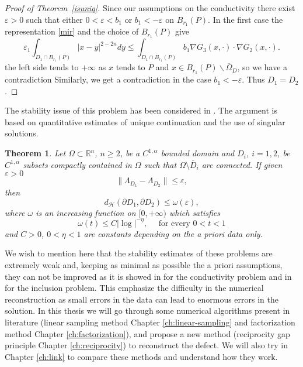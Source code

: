 \documentclass[10pt, a4paper, twoside, openright]{book}
\theoremstyle{definition}
\theoremstyle{plain}
\newtheorem{theorem}[subsection]{Theorem}
\theoremstyle{plain}
\theoremstyle{plain}
\theoremstyle{plain}
\theoremstyle{plain}
\theoremstyle{plain}
\theoremstyle{plain}
\theoremstyle{plain}
\begin{document}
\begin{proof}[Proof of Theorem~\ref{isuniq}]
Since our assumptions on the conductivity there exist $\varepsilon>0$ such that
either $0<\varepsilon<b_1$ or $b_1<-\varepsilon$ on $B_{r_1}(P)$.
In the first case the representation \eqref{mir} and the choice of
$B_{r_1}(P)$ give
$$\varepsilon_1\int_{D_1\cap B_{r_1}(P)}|x-y|^{2-2n}dy
\leq\int_{D_1\cap B_{r_1}(P)}b_1\nabla G_3(x,\cdot)\cdot\nabla G_2(x,\cdot).$$
the left side tends to $+\infty$ as $x$ tends to $P$
and $x\in B_{r_1}(P)\smallsetminus\overline\Omega_D$, so we have a contradiction
Similarly, we get a contradiction in the case $b_1<-\varepsilon$.
Thus $D_1=D_2$.
\end{proof}
The stability issue of this problem has been considered in \cite{Al-DC}.
The argument is based on quantitative estimates of unique continuation and the use of singular solutions.
\begin{theorem}
Let $\Omega\subset\mathbb R^n$, $n\geq2$, be a $C^{1,\alpha}$ bounded domain and
$D_i$, $i=1,2$, be $C^{1,\alpha}$ subsets compactly contained in $\Omega$ such that
$\Omega\setminus\overline D_i$ are connected. If given $\varepsilon>0$
$$\|\Lambda_{D_1}-\Lambda_{D_2}\|\leq\varepsilon,$$
then
$$d_\mathcal H(\partial D_1,\partial D_2)\leq\omega(\varepsilon),$$
where $\omega$ is an increasing function on $[0,+\infty)$ which satisfies
$$\omega(t)\leq C|\log|^{-\eta},\quad\textrm{ for every } 0<t<1$$
and $C>0$, $0<\eta<1$ are constants depending on the a priori data only.
\end{theorem}
We wish to mention here that the stability estimates of these problems are extremely weak
and, keeping as minimal as possible the a priori assumptions, they can not be improved as it
is showed in \cite{Ma} for the conductivity problem and in \cite{DC-Ro} for the inclusion problem.
This emphasize the difficulty in the numerical reconstruction as small errors in the data
can lead to enormous errors in the solution.
In this thesis we will go through some numerical algorithms present in literature
(linear sampling method Chapter \ref{ch:linear-sampling} and factorization method Chapter \ref{ch:factorization}), 
and propose a new method (reciprocity gap principle Chapter \ref{ch:reciprocity}) to reconstruct the defect.
We will also try in Chapter \ref{ch:link} to compare these methods and understand how they work.
\end{document}
